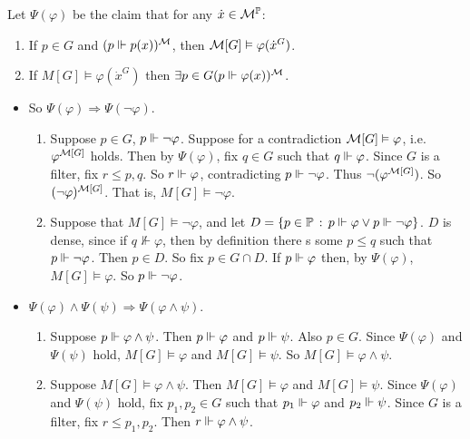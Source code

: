 \documentclass{article}
\begin{document}
    Let $\Psi(\varphi)$ be the claim that for any $\dot{x} \in \mathcal{M}^{\mathbb{P}}$: \begin{enumerate}
        \item[(i)] If $p \in G$ and $(p \Vdash p(x))^{\mathcal{M}}$, then $\mathcal{M}[G] \vDash \varphi(\dot{x}^{G})$.
        \item[(ii)] If $M[G] \models \varphi(\dot{x}^{G})$ then $\exists p \in G (p \Vdash \varphi(x))^{\mathcal{M}}$.
    \end{enumerate}
    \begin{itemize}
        \item So $\Psi(\varphi) \Rightarrow \Psi(\neg \varphi)$.
              \begin{enumerate}
                  \item[(i)] Suppose $p \in G$, $p \Vdash \neg \varphi$. Suppose for a contradiction $\mathcal{M}[G] \vDash \varphi$, i.e. $\varphi^{\mathcal{M}[G]}$ holds. Then by $\Psi(\varphi)$, fix $q \in G$ such that $q \Vdash \varphi$. Since $G$ is a filter, fix $r \leq p,q$. So $r \Vdash \varphi$, contradicting $p \Vdash \neg \varphi$. Thus $\neg(\varphi^{\mathcal{M}[G]})$. So $(\neg \varphi)^{\mathcal{M}[G]}$. That is, $M[G] \models \neg \varphi$.
                  \item[(ii)] Suppose that $M[G] \models \neg \varphi$, and let $D = \{ p \in \mathbb{P} \, : \, p \Vdash \varphi \vee p \Vdash \neg \varphi\}$. $D$ is dense, since if $q \nVdash \varphi$, then by definition there s some $p \leq q$ such that $p \Vdash \neg \varphi$. Then $p \in D$. So fix $p \in G \cap D$. If $p \Vdash \varphi$ then, by $\Psi(\varphi)$, $M[G]\models \varphi$. So $p \Vdash \neg \varphi$.
              \end{enumerate}
        \item $\Psi(\varphi) \wedge \Psi(\psi) \Rightarrow \Psi(\varphi \wedge \psi)$.
              \begin{enumerate}
                  \item[(i)] Suppose $p \Vdash \varphi \wedge \psi$. Then $p \Vdash \varphi$ and $p \Vdash \psi$. Also $p \in G$. Since $\Psi(\varphi)$ and $\Psi(\psi)$ hold, $M[G] \models \varphi$ and $M[G] \models \psi$. So $M[G] \models \varphi \wedge \psi$.
                  \item[(ii)] Suppose $M[G] \models \varphi \wedge \psi$. Then $M[G] \models \varphi$ and $M[G] \models \psi$. Since $\Psi(\varphi)$ and $\Psi(\psi)$ hold, fix $p_{1},p_{2} \in G$ such that $p_{1} \Vdash \varphi$ and $p_{2} \Vdash \psi$. Since $G$ is a filter, fix $r \leq p_{1}, p_{2}$. Then $r \Vdash \varphi \wedge \psi$.

\end{enumerate}
\end{itemize}
\end{document}
